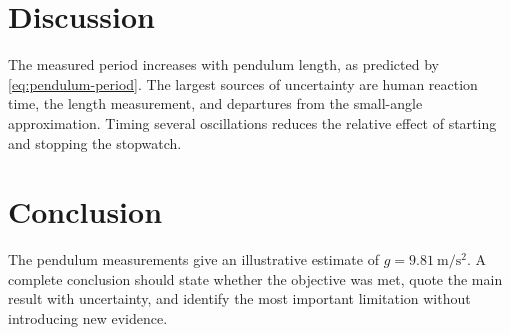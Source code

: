 \section{Discussion}

The measured period increases with pendulum length, as predicted by
\autoref{eq:pendulum-period}. The largest sources of uncertainty are human
reaction time, the length measurement, and departures from the small-angle
approximation. Timing several oscillations reduces the relative effect of
starting and stopping the stopwatch.

\section{Conclusion}

The pendulum measurements give an illustrative estimate of
$g=\qty{9.81}{\meter\per\second\squared}$. A complete conclusion should state
whether the objective was met, quote the main result with uncertainty, and
identify the most important limitation without introducing new evidence.
